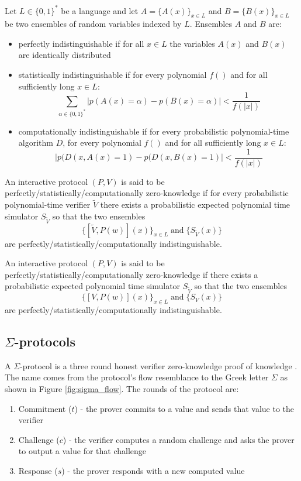 \begin{defn}[Indistinguishability]
  Let $L \in \{0,1\}^*$ be a language and let $A = \{A(x)\}_{x \in L}$
  and $B = \{B(x)\}_{x \in L}$ be two ensembles of random variables
  indexed by $L$. Ensembles $A$ and $B$ are:
  \begin{itemize}
  \item perfectly indistinguishable if for all $x \in L$ the variables
    $A(x)$ and $B(x)$ are identically distributed
  \item statistically indistinguishable if for every polynomial $f()$
    and for all sufficiently long $x \in L$:
    \[
    \sum_{\alpha \in \{0,1\}^*} | p(A(x) = \alpha) - p(B(x) = \alpha)|
    < \frac{1}{f(|x|)}
    \]
  \item computationally indistinguishable if for every probabilistic
    polynomial-time algorithm $D$, for every polynomial $f()$ and for
    all sufficiently long $x \in L$:
    \[
    |p(D(x, A(x) = 1) - p(D(x, B(x) = 1)| < \frac{1}{f(|x|)}
    \]
  \end{itemize}
\end{defn}

\begin{defn}
  An interactive protocol $(P, V)$ is said to be
  perfectly/statistically/computationally zero-knowledge if for
  every probabilistic polynomial-time verifier $\tilde{V}$ there
  exists a probabilistic expected polynomial time simulator
  $S_{\tilde{V}}$ so that the two ensembles
  \[
  \{[\tilde{V}, P(w)](x)\}_{x \in L} \; \textrm{and} \; \{S_{\tilde{V}}(x)\}
  \]
  are perfectly/statistically/computationally indistinguishable.
\end{defn}

\begin{defn}
  An interactive protocol $(P, V)$ is said to be
  perfectly/statistically/computationally zero-knowledge if there
  exists a probabilistic expected polynomial time simulator
  $S_{\tilde{V}}$ so that the two ensembles
  \[
  \{[V, P(w)](x)\}_{x \in L} \; \textrm{and} \; \{S_V(x)\}
  \]
  are perfectly/statistically/computationally indistinguishable.
\end{defn}

\subsection{$\Sigma$-protocols}

A $\Sigma$-protocol is a three round honest verifier zero-knowledge
proof of knowledge \cite{cryptography_introduction}. The name comes
from the protocol's flow resemblance to the Greek letter $\Sigma$ as
shown in Figure \ref{fig:sigma_flow}. The rounds of the protocol are:
\begin{enumerate}
\item Commitment ($t$) - the prover commits to a value and sends that
  value to the verifier
\item Challenge ($c$) - the verifier computes a random challenge and asks
  the prover to output a value for that challenge
\item Response ($s$) - the prover responds with a new computed value
\end{enumerate}

